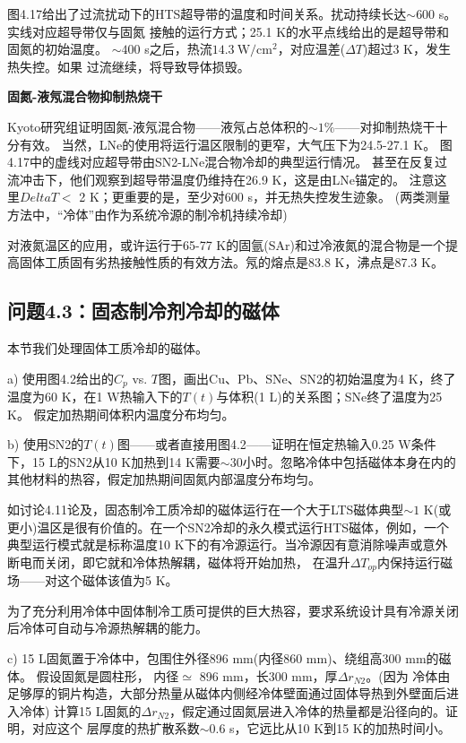 图4.17给出了过流扰动下的HTS超导带的温度和时间关系。扰动持续长达$\sim 600$ s。实线对应超导带仅与固氮
接触的运行方式；25.1 K的水平点线给出的是超导带和固氮的初始温度。
$\sim 400$ s之后，热流$14.3\ \mathrm{W/cm^2}$，对应温差($\Delta T$)超过3 K，发生热失控。如果
过流继续，将导致导体损毁。

\textbf{固氮-液氖混合物抑制热烧干}

Kyoto研究组证明固氮-液氖混合物——液氖占总体积的$\sim 1\%$——对抑制热烧干十分有效。
当然，LNe的使用将运行温区限制的更窄，大气压下为24.5-27.1 K。
图4.17中的虚线对应超导带由SN2-LNe混合物冷却的典型运行情况。
甚至在反复过流冲击下，他们观察到超导带温度仍维持在26.9 K，这是由LNe锚定的。
注意这里$Delta T<$ 2 K；更重要的是，至少对600 s，并无热失控发生迹象。
(两类测量方法中，“冷体”由作为系统冷源的制冷机持续冷却)

对液氮温区的应用，或许运行于65-77 K的固氩(SAr)和过冷液氮的混合物是一个提高固体工质固有劣热接触性质的有效方法。氖的熔点是83.8 K，沸点是87.3 K。



\subsection{问题4.3：固态制冷剂冷却的磁体}
本节我们处理固体工质冷却的磁体。

a) 使用图4.2给出的$C_p$ vs. $T$图，画出Cu、Pb、SNe、SN2的初始温度为4 K，终了温度为60 K，在1 W热输入下的$T(t)$与体积(1 L)的关系图；SNe终了温度为25 K。
假定加热期间体积内温度分布均匀。

b) 使用SN2的$T(t)$图——或者直接用图4.2——证明在恒定热输入0.25 W条件下，15 L的SN2从10 K加热到14 K需要$\sim 30$小时。忽略冷体中包括磁体本身在内的其他材料的热容，假定加热期间固氮内部温度分布均匀。

如讨论4.11论及，固态制冷工质冷却的磁体运行在一个大于LTS磁体典型$\sim 1$ K(或更小)温区是很有价值的。在一个SN2冷却的永久模式运行HTS磁体，例如，一个典型运行模式就是标称温度10 K下的有冷源运行。当冷源因有意消除噪声或意外断电而关闭，即它就和冷体热解耦，磁体将开始加热，
在温升$\Delta T_{op}$内保持运行磁场——对这个磁体该值为5 K。

为了充分利用冷体中固体制冷工质可提供的巨大热容，要求系统设计具有冷源关闭后冷体可自动与冷源热解耦的能力。

c) 15 L固氮置于冷体中，包围住外径896 mm(内径860 mm)、绕组高300 mm的磁体。
假设固氮是圆柱形， 内径$\simeq$ 896 mm，长300 mm，厚$\Delta r_{N2}$。(因为
冷体由足够厚的铜片构造，大部分热量从磁体内侧经冷体壁面通过固体导热到外壁面后进入冷体) 计算15 L固氮的$\Delta r_{N2}$，假定通过固氮层进入冷体的热量都是沿径向的。证明，对应这个
层厚度的热扩散系数$\sim 0.6$ s，它远比从10 K到15 K的加热时间小。

